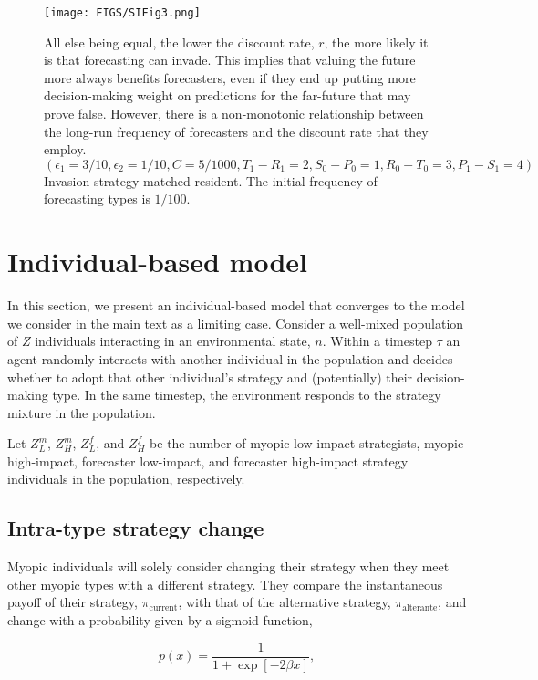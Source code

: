 \documentclass{article}
\begin{document}
\begin{figure}[htpb]
    \centering
    \texttt{[image: FIGS/SIFig3.png]}
    \caption{All else being equal, the lower the discount rate, $r$, the more likely it is that forecasting can invade. This implies that valuing the future more always benefits forecasters, even if they end up putting more decision-making weight on predictions for the far-future that may prove false. However, there is a non-monotonic relationship between the long-run frequency of forecasters and the discount rate that they employ.  $\left(
\epsilon_1 = 3/10, 
\epsilon_2 = 1/10, 
C = 5/1000, 
T_1-R_1 = 2, 
S_0-P_0 = 1, 
R_0-T_0 = 3, 
P_1-S_1 = 4\right)
$ Invasion strategy matched resident. The initial frequency of forecasting types is $1/100$.}
    \label{invasionSuccessRate}
\end{figure}

\section{Individual-based model}\label{IBM}

In this section, we present an individual-based model that converges to the model we consider in the main text as a limiting case. Consider a well-mixed population of $Z$ individuals interacting in an environmental state, $n$. Within a timestep $\tau$ an agent randomly interacts with another individual in the population and decides whether to adopt that other individual's strategy and (potentially) their decision-making type. In the same timestep, the environment responds to the strategy mixture in the population.

Let $Z^m_L$, $Z^m_H$, $Z^f_L$, and $Z^f_H$ be the number of myopic low-impact strategists, myopic high-impact, forecaster low-impact, and forecaster high-impact strategy individuals in the population, respectively. 

\subsection{Intra-type strategy change}
Myopic individuals will solely consider changing their strategy when they meet other myopic types with a different strategy. They compare the instantaneous payoff of their strategy, $\pi_\text{current}$, with that of the alternative strategy, $\pi_\text{alterante}$, and change with a probability given by a sigmoid function,

\begin{equation}
    p(x)=\frac{1}{1+\exp{\left[-2\beta x\right]}},
\end{equation}
\end{document}
